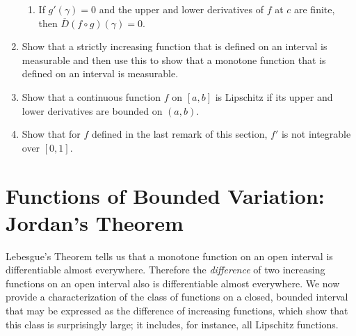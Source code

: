 \begin{enumerate}
\begin{enumerate}[label=(\roman*),align=left]
        \item If $g'(\gamma)=0$ and the upper and lower derivatives of $f$ at $c$ are finite, then $\overline{D}(f\circ g)(\gamma)=0$.
    \end{enumerate}
    \item Show that a strictly increasing function that is defined on an interval is measurable and then use this to show that a monotone function that is defined on an interval is measurable.
    \item Show that a continuous function $f$ on $[a,b]$ is Lipschitz if its upper and lower derivatives are bounded on $(a,b)$.
    \item Show that for $f$ defined in the last remark of this section, $f'$ is not integrable over $[0,1]$.
\end{enumerate}

\section{Functions of Bounded Variation: Jordan's Theorem}

Lebesgue's Theorem tells us that a monotone function on an open interval is differentiable almost everywhere.
Therefore the \textit{difference} of two increasing functions on an open interval also is differentiable almost everywhere.
We now provide a characterization of the class of functions on a closed, bounded interval that may be expressed as the difference of increasing functions, which show that this class is surprisingly large;
it includes, for instance, all Lipschitz functions.

